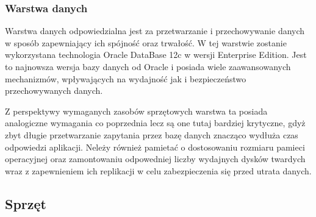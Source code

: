 \subsubsection{Warstwa danych}

Warstwa danych odpowiedzialna jest za przetwarzanie i przechowywanie
danych w sposób zapewniający ich spójność oraz trwałość. W tej
warstwie zostanie wykorzystana technologia Oracle DataBase 12c w
wersji Enterprise Edition. Jest to najnowsza wersja bazy danych od
Oracle i posiada wiele zaawansowanych mechanizmów, wpływających na
wydajność jak i bezpieczeństwo przechowywanych danych.

Z perspektywy wymaganych zasobów sprzętowych warstwa ta posiada
analogiczne wymagania co poprzednia lecz są one tutaj bardziej
krytyczne, gdyż zbyt długie przetwarzanie zapytania przez bazę danych
znacząco wydłuża czas odpowiedzi aplikacji. Neleży również pamietać o
dostosowaniu rozmiaru pamieci operacyjnej oraz zamontowaniu
odpowedniej liczby wydajnych dysków twardych wraz z zapewnieniem ich
replikacji w celu zabezpieczenia się przed utrata danych.

\subsection{Sprzęt}



